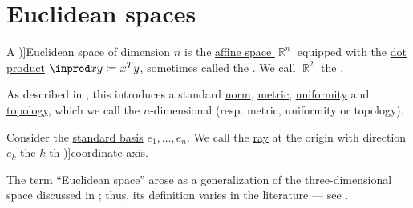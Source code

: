 \section{Euclidean spaces}\label{sec:euclidean_spaces}

\begin{definition}\label{def:euclidean_space}\mimprovised
  A \term[ru=Евклидово пространство (\cite[40]{Вулих1973ВещественныйАнализ})]{Euclidean space} of dimension \( n \) is the \hyperref[def:affine_space]{affine space \( \BbbR^n \)} equipped with the \hyperref[def:inner_product_space]{dot product} \( \inprod x y \coloneqq x^T y \), sometimes called the . We call \( \BbbR^2 \) the .

  As described in , this introduces a standard \hyperref[def:norm]{norm}, \hyperref[def:metric_space]{metric}, \hyperref[def:uniform_space]{uniformity} and \hyperref[def:topological_space]{topology}, which we call the \( n \)-dimensional  (resp. metric, uniformity or topology).

  Consider the \hyperref[def:coordinate_space]{standard basis} \( e_1, \ldots, e_n \). We call the \hyperref[def:geometric_ray]{ray} at the origin with direction \( e_k \) the \( k \)-th \term[ru=координатная ось (\cite[39]{Вулих1973ВещественныйАнализ})]{coordinate axis}.

\end{definition}
\begin{comments}
  \item The term \enquote{Euclidean space} arose as a generalization of the three-dimensional space discussed in \cite{Euclids2008Elements}; thus, its definition varies in the literature --- see .
\end{comments}

